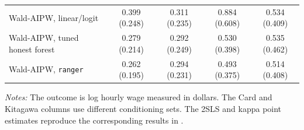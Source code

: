 \documentclass[12pt, a4paper, oneside]{article}
\theoremstyle{plain}
\theoremstyle{definition}
\begin{document}
\begin{table}[H]
\begin{threeparttable}
\begin{tabular}{@{}lcccc@{}}
Wald-AIPW, linear/logit
& 0.399 (0.248)
& 0.311 (0.235)
& 0.884 (0.608)
& 0.534 (0.409) \\

Wald-AIPW, tuned honest forest
& 0.279 (0.214)
& 0.292 (0.249)
& 0.530 (0.398)
& 0.535 (0.462) \\

Wald-AIPW, \texttt{ranger}
& 0.262 (0.195)
& 0.294 (0.231)
& 0.493 (0.375)
& 0.514 (0.408) \\

\bottomrule
\end{tabular}

\begin{tablenotes}
\footnotesize
\item \textit{Notes:}  The outcome is log hourly wage measured in
dollars. The Card and Kitagawa columns use different conditioning sets.
The 2SLS and kappa point estimates reproduce the corresponding results in
\citet[Table~3]{sloczynski2025abadie}. 
\end{tablenotes}
\end{threeparttable}
\end{table}
\end{document}
